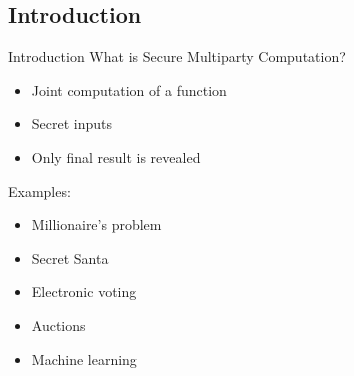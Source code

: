 \begin{frame}
\section{Introduction}
\end{frame}

\begin{frame}{Introduction}
\protect\hypertarget{introduction}{}
What is Secure Multiparty Computation?

\begin{itemize}
\tightlist
\item
  Joint computation of a function
\item
  Secret inputs
\item
  Only final result is revealed
\end{itemize}

Examples:

\begin{itemize}
\tightlist
\item
  Millionaire's problem
\item
  Secret Santa
\item
  Electronic voting
\item
  Auctions
\item
  Machine learning
\end{itemize}
\end{frame}

